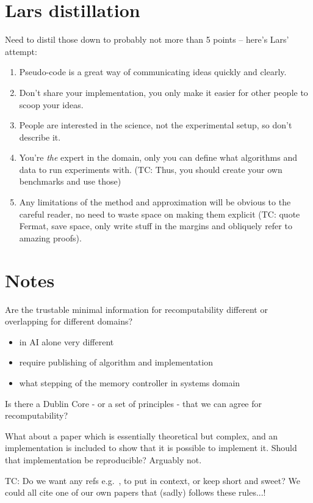 \documentclass[a4paper,11pt]{article}
\begin{document}
\section{Lars distillation}
Need to distil those down to probably not more than 5 points -- here's Lars'
attempt:
\begin{enumerate}
\item Pseudo-code is a great way of communicating ideas quickly and clearly.
\item Don't share your implementation, you only make it easier for other people
to scoop your ideas.
\item People are interested in the science, not the experimental setup, so don't
describe it.
\item You're \emph{the} expert in the domain, only you can define what
algorithms and data to run experiments with. (TC: Thus, you should
create your own benchmarks and use those)
\item Any limitations of the method and approximation will be obvious to the
careful reader, no need to waste space on making them explicit (TC:
quote Fermat, save space, only write stuff in the margins and obliquely
refer to amazing proofs).
\end{enumerate}

\section{Notes}


Are the trustable minimal information for recomputability  different or overlapping for different domains?
\begin{itemize}
\item in AI alone very different
\item require publishing of algorithm and implementation
\item what stepping of the memory controller in systems domain
\end{itemize}

Is there a Dublin Core - or a set of principles - that we can agree
for recomputability?

What about a paper which is essentially theoretical but complex, and
an implementation is included to show that it is possible to implement
it. Should that implementation be reproducible? Arguably not.

TC: Do we want any refs
e.g.~\cite{crick-et-al_wssspe2,crick-et-al_recomp2014}, to put in
context, or keep short and sweet? We could all cite one of our own
papers that (sadly) follows these rules...!



\end{document}
